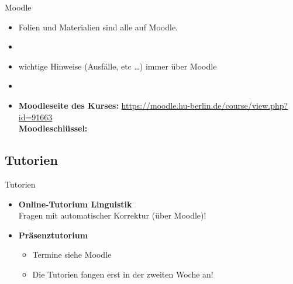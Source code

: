 \begin{frame}{Moodle}

\begin{itemize}
	\item Folien und Materialien sind alle auf Moodle.
	\item[]
	\item wichtige Hinweise (Ausfälle, etc \dots) immer über Moodle
	\item[]
	\item \textbf{Moodleseite des Kurses:} \url{https://moodle.hu-berlin.de/course/view.php?id=91663}\\
	\textbf{Moodleschlüssel:} %
\end{itemize}		

\end{frame}

%
\subsection{Tutorien}

\begin{frame}{Tutorien}

	\begin{itemize}
		\item \textbf{Online-Tutorium Linguistik} \ras\\
                Fragen mit automatischer Korrektur (über Moodle)!\\
		\item \textbf{Präsenztutorium}
		
		\begin{itemize}
			\item Termine siehe Moodle %
			\item Die Tutorien fangen erst in der zweiten Woche an!
		\end{itemize}
		
	\end{itemize}
	
\end{frame}


